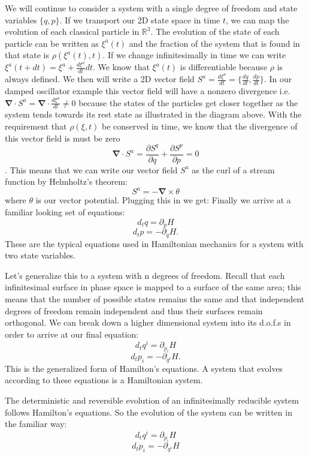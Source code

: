 \documentclass{article}
\begin{document}
	We will continue to consider a system with a single degree of freedom and state variables $\{q,p \}$. If we transport our 2D state space in time $t$, we can map the evolution of each classical particle in $\mathbb{R}^3$. The evolution of the state of each particle can be written as $\xi^a(t)$ and the fraction of the system that is found in that state is $\rho(\xi^a(t), t)$. If we change infinitesimally in time we can write $\xi^a(t + dt) = \xi^a + \frac{d\xi^a}{dt}dt$. We know that $\xi^a(t)$ is differentiable because $\rho$ is always defined. We then will write a 2D vector field $S^a =\frac{d\xi^a}{dt} = \{\frac{dq}{dt},\frac{dp}{dt} \}$. In our damped oscillator example this vector field will have a nonzero divergence i.e. $\mathbf{\nabla} \cdot S^a =\mathbf{\nabla} \cdot \frac{d\xi^a}{dt} \neq 0$ because the states of the particles get closer together as the system tends towards its rest state as illustrated in the diagram above. With the requirement that $\rho(\xi,t)$ be conserved in time, we know that the divergence of this vector field is must be zero $$\mathbf{\nabla} \cdot S^a = \frac{\partial S^q}{\partial q} + \frac{\partial S^p}{\partial p} = 0$$. This means that we can write our vector field $S^a$ as the curl of a stream function by Helmholtz's theorem: $$S^a = -\mathbf{\nabla} \times \theta$$ where $\theta$ is our vector potential. Plugging this in we get: Finally we arrive at a familiar looking set of equations: $$d_t q = \partial _{p} H$$ $$d_t p = -\partial _q H.$$ These are the typical equations used in Hamiltonian mechanics for a system with two state variables.
	
	Let's generalize this to a system with n degrees of freedom. Recall that each infinitesimal surface in phase space is mapped to a surface of the same area; this means that the number of possible states remains the same and that independent degrees of freedom remain independent and thus their surfaces remain orthogonal. We can break down a higher dimensional system into its d.o.f.s in order to arrive at our final equation: $$d_tq^i = \partial_{p_i}H$$ $$d_tp_i = -\partial_{q^i}H.$$ This is the generalized form of Hamilton's equations. A system that evolves according to these equations is a Hamiltonian system.

\begin{prop}
	The deterministic and reversible evolution of an infinitesimally reducible system follows Hamilton's equations. So the evolution of the system can be written in the familiar way:
	$$d_tq^i = \partial_{p_i}H$$
	$$d_tp_i = -\partial_{q^i}H$$
\end{prop} 
\end{document}
